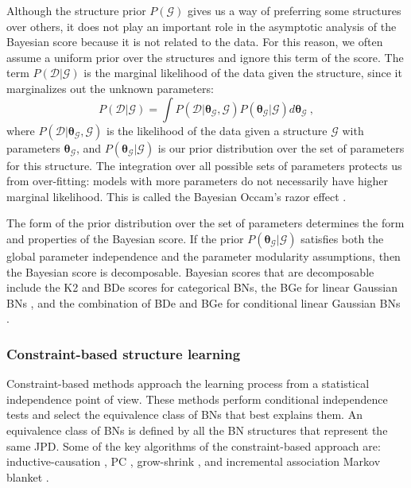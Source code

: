 Although the structure prior $P(\mathcal{G})$ gives us a way of preferring some structures over others, it does not play an important role in the asymptotic analysis of the Bayesian score because it is not related to the data. For this reason, we often assume a uniform prior over the structures and ignore this term of the score. The term $P(\mathcal{D} | \mathcal{G})$ is the marginal likelihood of the data given the structure, since it marginalizes out the unknown parameters:
\begin{equation*}
P(\mathcal{D} | \mathcal{G}) = \int P(\mathcal{D} | \bm{\theta}_{\mathcal{G}}, \mathcal{G}) P(\bm{\theta}_{\mathcal{G}} | \mathcal{G}) d\bm{\theta}_{\mathcal{G}} \ ,
\end{equation*}
where $P(\mathcal{D} | \bm{\theta}_{\mathcal{G}}, \mathcal{G})$ is the likelihood of the data given a structure $\mathcal{G}$ with parameters $\bm{\theta}_{\mathcal{G}}$, and $P(\bm{\theta}_{\mathcal{G}} | \mathcal{G})$ is our prior distribution over the set of parameters for this structure. The integration over all possible sets of parameters protects us from over-fitting: models with more parameters do not necessarily have higher marginal likelihood. This is called the Bayesian Occam's razor effect \citep{mackay1991}. 

The form of the prior distribution over the set of parameters determines the form and properties of the Bayesian score. If the prior $P(\bm{\theta}_{\mathcal{G}} | \mathcal{G})$ satisfies both the global parameter independence and the parameter modularity assumptions, then the Bayesian score is decomposable. Bayesian scores that are decomposable include the K2 \citep{cooper1992} and BDe \citep{heckerman1995_bde} scores for categorical BNs, the BGe for linear Gaussian BNs \citep{geiger1994_bge}, and the combination of BDe and BGe for conditional linear Gaussian BNs \citep{heckerman1995_unification}.

\subsubsection{Constraint-based structure learning}

Constraint-based methods approach the learning process from a statistical independence point of view. These methods perform conditional independence tests and select the equivalence class of BNs that best explains them. An equivalence class of BNs is defined by all the BN structures that represent the same JPD.  Some of the key algorithms of the constraint-based approach are: inductive-causation \citep{verma1990}, PC \citep{spirtes2000}, grow-shrink \citep{margaritis2003}, and incremental association Markov blanket \citep{tsamardinos2003}.


